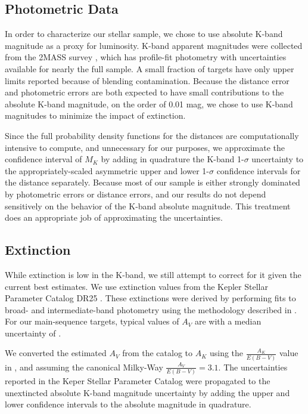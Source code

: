 \documentclass[manuscript]{aastex6}
\newcommand{\gvs}{\authorcomment1}
\begin{document}
\subsection{Photometric Data}

In order to characterize our stellar sample, we chose to use absolute K-band
magnitude as a proxy for luminosity. K-band apparent magnitudes were collected 
from the 2MASS survey 
\citep{Skrutskie06}, which has profile-fit photometry with uncertainties 
available for nearly the full sample. A small fraction of targets have only 
upper limits reported because of blending contamination. \gvs{Typical K error} 
Because the distance error and photometric
errors are both expected to have small contributions to the absolute K-band
magnitude, on the order of 0.01 mag, we chose to use K-band magnitudes to
minimize the impact of extinction.


Since the full probability density functions for the distances are
computationally intensive to compute, and unnecessary for our purposes, we
approximate the confidence interval of \(M_K\) by adding in quadrature the 
K-band 1-\(\sigma\) uncertainty to the appropriately-scaled asymmetric upper 
and lower 1-\(\sigma\) confidence intervals for the distance separately. 
Because most of our sample is either strongly dominated by photometric errors 
or distance errors, and our results do not depend sensitively on the behavior 
of the K-band absolute magnitude. This treatment does an appropriate job of
approximating the uncertainties.

\subsection{Extinction}

While extinction is low in the K-band, we still attempt to correct for it given
the current best estimates. We use extinction values from the Kepler Stellar
Parameter Catalog DR25 \citep{Mathur17}. These extinctions were derived by
performing fits to broad- and intermediate-band photometry using the
methodology described in \citet{Huber14}. For our main-sequence targets,
typical values of \(A_V\) are \gvs{NUM} with a median uncertainty of \gvs{NUM}.

We converted the estimated \(A_V\) from the catalog to \(A_K\) using the
\(\frac{A_K}{E(B-V)}\) value in \citet{Cardelli89}, and assuming the
canonical Milky-Way \(\frac{A_V}{E(B-V)} = 3.1\). The uncertainties reported in
the Keper Stellar Parameter Catalog were propagated to the unextincted absolute
K-band magnitude uncertainty by adding the upper and lower confidence intervals
to the absolute magnitude in quadrature.
\end{document}
